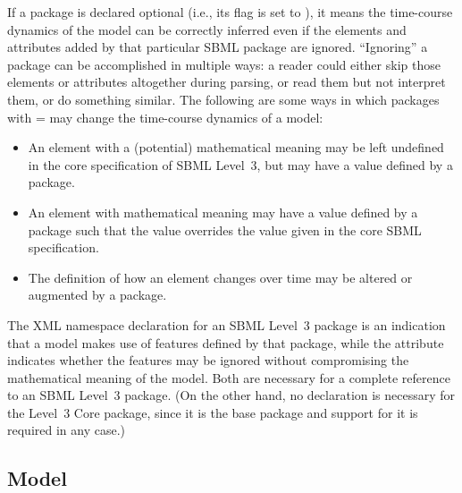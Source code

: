 \begin{enumerate}
  If a package is declared optional (i.e., its  flag is set to ), it means the
  time-course dynamics of the model can be correctly
  inferred even if the elements and attributes added by that
  particular SBML package are ignored.
  ``Ignoring'' a package can be accomplished in multiple ways: a
  reader could either skip those elements or attributes altogether
  during parsing, or read them but not interpret them, or do
  something similar.  The following are some ways in which packages with = may change the time-course dynamics of a model:
\begin{itemize}
  \item An element with a (potential) mathematical meaning may be left undefined in the core specification of SBML Level~3, but may have a value defined by a package.
  \item An element with mathematical meaning may have a value defined by a package such that the value overrides the value given in the core SBML specification.
  \item The definition of how an element changes over time may be altered or augmented by a package.
\end{itemize}
\end{enumerate}

The XML namespace declaration for an SBML Level~3 package is an
indication that a model makes use of features defined by that
package, while the  attribute indicates whether
the features may be ignored without compromising the mathematical
meaning of the model.  Both are necessary for a complete reference
to an SBML Level~3 package.  (On the other hand, no declaration is
necessary for the Level~3 Core package, since it is the base
package and support for it is required in any case.)

\subsection{Model}
\label{sec:model}

